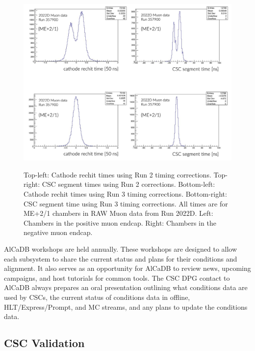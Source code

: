 \begin{figure}[H]
    \centering
    {\includegraphics[width=1\textwidth]{Images/DetectorPerformance/TimingStudy/CSCRechitSegmentTimes.png}}
    \caption{Top-left: Cathode rechit times using Run 2 timing corrections. Top-right: CSC segment times using Run 2 corrections. Bottom-left: Cathode rechit times using Run 3 timing corrections. Bottom-right: CSC segment time using Run 3 timing corrections. All times are for ME+2/1 chambers in RAW Muon data from Run 2022D. Left: Chambers in the positive muon endcap. Right: Chambers in the negative muon endcap.}
    \label{fig:TimingVal1}
\end{figure}

AlCaDB workshops are held annually. These workshops are designed to allow each subsystem to share the current status and plans for their conditions and alignment. It also serves as an opportunity for AlCaDB to review news, upcoming campaigns, and host tutorials for common tools. The CSC DPG contact to AlCaDB always prepares an oral presentation outlining what conditions data are used by CSCs, the current status of conditions data in offline, HLT/Express/Prompt, and MC streams, and any plans to update the conditions data.

\subsection{CSC Validation}

